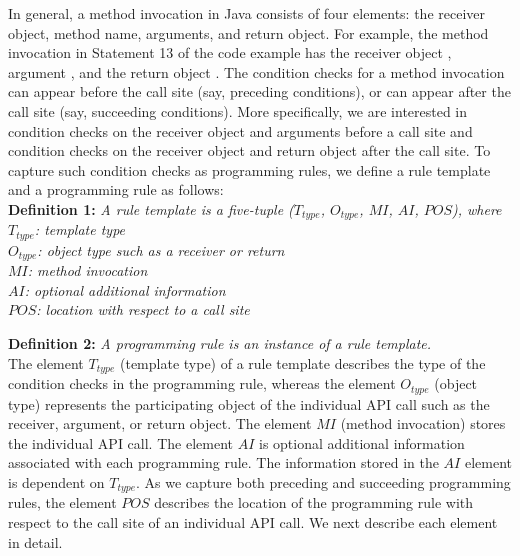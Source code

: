 In general, a method invocation
in Java consists of four elements: the receiver object, method name, arguments, and return object.
For example, the method invocation in Statement 13 of the code example has the receiver object ,
argument , and the return object .
The condition checks for a method invocation can appear before the call site (say, preceding conditions),
or can appear after the call site (say, succeeding conditions). More specifically,
we are interested in condition checks on the receiver object and arguments 
before a call site and condition checks on the receiver object and return object after
the call site. To capture such condition checks as programming rules, 
we define a rule template and a programming rule as follows:\\

\textbf{Definition 1:} \emph{A rule template is a five-tuple ($T_{type}$, $O_{type}$, $MI$, $AI$, $POS$), where\\
\hspace*{0.3in}$T_{type}$: template type\\
\hspace*{0.3in}$O_{type}$: object type such as a receiver or return\\
\hspace*{0.3in}$MI$: method invocation\\
\hspace*{0.3in}$AI$: optional additional information\\
\hspace*{0.3in}$POS$: location with respect to a call site}

\textbf{Definition 2:} \emph{A programming rule is an instance of a rule template.}\\

The element $T_{type}$ (template type) of a rule template describes
the type of the condition checks in the programming rule, whereas the element $O_{type}$ (object type)
represents the participating object of the individual API call such as the receiver,
argument, or return object. The element $MI$ (method invocation) stores the individual API call.
The element $AI$ is optional additional information associated with each programming
rule. The information stored in the $AI$ element is dependent on $T_{type}$.
As we capture both preceding and succeeding programming rules, the element
$POS$ describes the location of the programming rule with respect to the call site of an 
individual API call. We next describe each element in detail.

